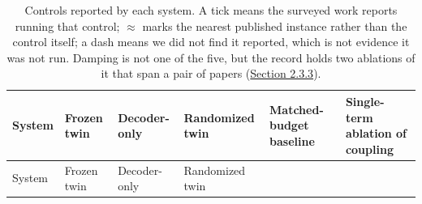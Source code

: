 \documentclass[10pt]{article}
\begin{document}
\begin{longtable}[]{@{}
  >{\raggedright\arraybackslash}p{}
  >{\raggedright\arraybackslash}p{}
  >{\raggedright\arraybackslash}p{}
  >{\raggedright\arraybackslash}p{}
  >{\raggedright\arraybackslash}p{}
  >{\raggedright\arraybackslash}p{}@{}}
\caption{Controls reported by each system. A tick means the surveyed
work reports running that control; \ensuremath{\approx} marks the
nearest published instance rather than the control itself; a dash means
we did not find it reported, which is not evidence it was not run.
Damping is not one of the five, but the record holds two ablations of it
that span a pair of papers (\hyperref[sec-2-3-3]{Section
2.3.3}).}\tabularnewline
\toprule\noalign{}
\begin{minipage}[b]{\linewidth}\raggedright
System
\end{minipage} & \begin{minipage}[b]{\linewidth}\raggedright
Frozen twin
\end{minipage} & \begin{minipage}[b]{\linewidth}\raggedright
Decoder-only
\end{minipage} & \begin{minipage}[b]{\linewidth}\raggedright
Randomized twin
\end{minipage} & \begin{minipage}[b]{\linewidth}\raggedright
Matched-budget baseline
\end{minipage} & \begin{minipage}[b]{\linewidth}\raggedright
Single-term ablation of coupling
\end{minipage} \\
\midrule\noalign{}
\endfirsthead
\toprule\noalign{}
\begin{minipage}[b]{\linewidth}\raggedright
System
\end{minipage} & \begin{minipage}[b]{\linewidth}\raggedright
Frozen twin
\end{minipage} & \begin{minipage}[b]{\linewidth}\raggedright
Decoder-only
\end{minipage} & \begin{minipage}[b]{\linewidth}\raggedright
Randomized twin
\end{minipage} & \begin{minipage}[b]{\linewidth}\raggedright

\end{minipage}
\end{longtable}
\end{document}
